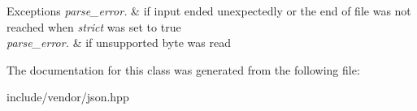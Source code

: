 \begin{DoxyExceptions}{Exceptions}
{\em parse\+\_\+error.} & if input ended unexpectedly or the end of file was not reached when {\itshape strict} was set to true \\
\hline
{\em parse\+\_\+error.} & if unsupported byte was read \\
\hline
\end{DoxyExceptions}


The documentation for this class was generated from the following file\+:\begin{DoxyCompactItemize}
\item 
include/vendor/json.\+hpp\end{DoxyCompactItemize}
